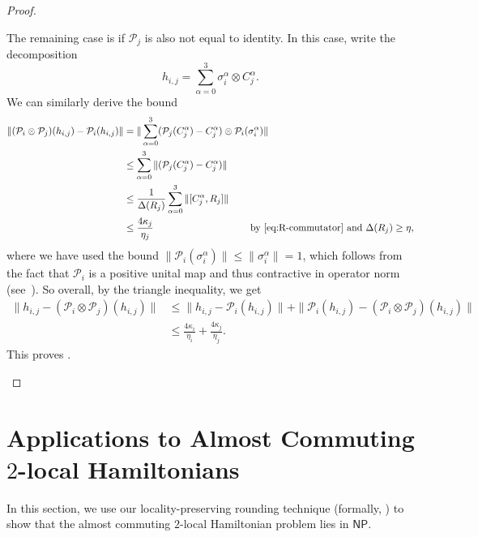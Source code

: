 \documentclass[11pt]{article}
\theoremstyle{plain}
\renewcommand{\cP}{\mathcal{P}}
\begin{document}
\begin{proof}
\begin{enumerate}
The remaining case is if $\cP_j$ is also not equal to identity. In this case, write the decomposition
\[ h_{i,j} = \sum_{\alpha=0}^{3} \sigma_i^\alpha \otimes C_j^\alpha. \]
We can similarly derive the bound
\begin{align}
    \| (\cP_i \otimes \cP_j)(h_{i,j}) - \cP_i(h_{i,j}) \| &= \| \sum_{\alpha =0}^3 (\cP_j(C_j^\alpha) - C_j^\alpha) \otimes \cP_i(\sigma_i^\alpha) \| \\
    &\leq  \sum_{\alpha =0}^3 \| (\cP_j(C_j^\alpha) - C_j^\alpha) \| \\
    &\leq \frac{1}{\Delta(R_j)} \sum_{\alpha =0}^3 \| [C_j^\alpha, R_j] \| \\
    &\leq \frac{4\kappa_j}{\eta_j} & \hspace{-1cm}\text{by \Cref{eq:R-commutator} and } \Delta(R_j) \geq \eta,
\end{align}
where we have used the bound $\| \cP_i(\sigma_i^\alpha) \| \leq \| \sigma_i^\alpha \| = 1$, which follows from the fact that $\cP_i$ is a positive unital map and thus contractive in operator norm (see~\cite[Theorem~6.12]{Watrous_2018}). 
So overall, by the triangle inequality, we get
\begin{align}
    \| h_{i,j} - (\cP_i \otimes \cP_j)(h_{i,j})  \| &\leq \| h_{i,j} - \cP_i(h_{i,j}) \| + \| \cP_i(h_{i,j}) - (\cP_i \otimes \cP_j)(h_{i,j}) \| \\
    &\leq \frac{4\kappa_i}{\eta_i} + \frac{4\kappa_j}{\eta_j}.
\end{align}
This proves .
\end{enumerate}
\end{proof}

\section{Applications to Almost Commuting $2$-local Hamiltonians}
In this section, we use our locality-preserving rounding technique (formally,  ) to show that the almost commuting $2$-local Hamiltonian problem lies in $\mathsf{NP}$.
\end{document}
